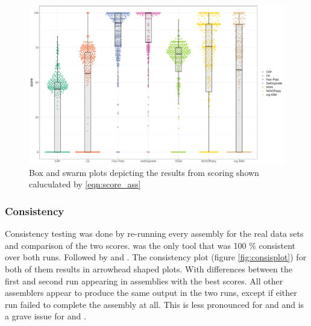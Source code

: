\begin{figure}[H]
\centering
\includegraphics[height=.45\textheight, width=.95\textwidth]{Figures/swarm}
\decoRule
\caption[Scores of assemblies from real data sets]{Box and swarm plots depicting the results from scoring shown caluculated by \ref{eqn:score_ass}}
\label{fig:swarm}
\end{figure}

\subsubsection{Consistency}

Consistency testing was done by re-running every assembly for the real data sets and comparison of the two
scores. \ce \hspace{0.5ex} was the only tool that was 100 \% consistent over both runs. Followed by \fp and
\np. The consistency plot (figure \ref{fig:consisplot}) for both of them results in arrowhead shaped
plots. With differences between the first and second run appearing in assemblies with the best scores. All
other assemblers appear to produce the same output in the two runs, except if either run failed to complete the
assembly at all. This is less pronounced for \cassp \hspace{0.5ex} and \go\hspace{0.5ex} and is a grave issue for \oa \hspace{0.5ex} and \ioga.

